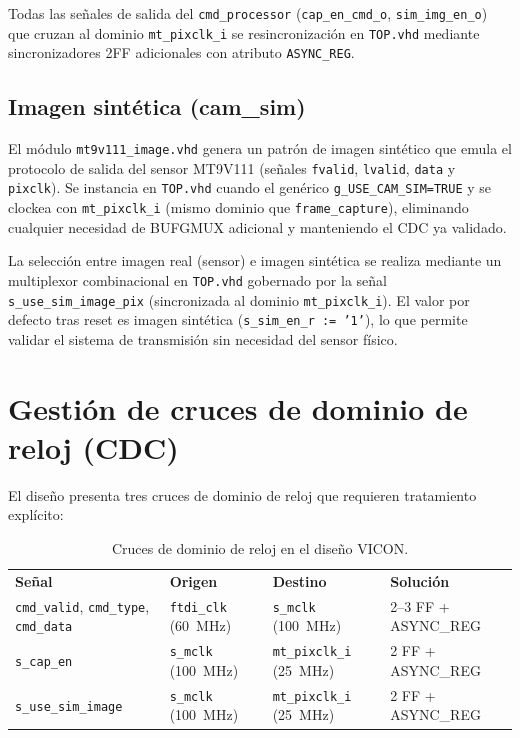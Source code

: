 \documentclass[../main.tex]{subfiles}
\begin{document}
Todas las señales de salida del \texttt{cmd\_processor} (\texttt{cap\_en\_cmd\_o}, \texttt{sim\_img\_en\_o}) que cruzan al dominio \texttt{mt\_pixclk\_i} se resincronización en \texttt{TOP.vhd} mediante sincronizadores 2FF adicionales con atributo \texttt{ASYNC\_REG}.

\subsection{Imagen sintética (cam\_sim)}
\label{sec:cam_sim}

El módulo \texttt{mt9v111\_image.vhd} genera un patrón de imagen sintético que emula el protocolo de salida del sensor MT9V111 (señales \texttt{fvalid}, \texttt{lvalid}, \texttt{data} y \texttt{pixclk}). Se instancia en \texttt{TOP.vhd} cuando el genérico \texttt{g\_USE\_CAM\_SIM=TRUE} y se clockea con \texttt{mt\_pixclk\_i} (mismo dominio que \texttt{frame\_capture}), eliminando cualquier necesidad de BUFGMUX adicional y manteniendo el CDC ya validado.

La selección entre imagen real (sensor) e imagen sintética se realiza mediante un multiplexor combinacional en \texttt{TOP.vhd} gobernado por la señal \texttt{s\_use\_sim\_image\_pix} (sincronizada al dominio \texttt{mt\_pixclk\_i}). El valor por defecto tras reset es imagen sintética (\texttt{s\_sim\_en\_r := '1'}), lo que permite validar el sistema de transmisión sin necesidad del sensor físico.

\section{Gestión de cruces de dominio de reloj (CDC)}
\label{sec:cdc}

El diseño presenta tres cruces de dominio de reloj que requieren tratamiento explícito:

\begin{table}[h]
\centering
\caption{Cruces de dominio de reloj en el diseño VICON.}
\label{tab:cdc}
\begin{tabular}{llll}
\rowcolor[HTML]{156082}
{\color{white}\textbf{Señal}} & {\color{white}\textbf{Origen}} & {\color{white}\textbf{Destino}} & {\color{white}\textbf{Solución}} \\
\rowcolor[HTML]{C0E6F5}
\texttt{cmd\_valid}, \texttt{cmd\_type}, \texttt{cmd\_data} & \texttt{ftdi\_clk} (60~MHz) & \texttt{s\_mclk} (100~MHz) & 2--3 FF + ASYNC\_REG \\
\texttt{s\_cap\_en} & \texttt{s\_mclk} (100~MHz) & \texttt{mt\_pixclk\_i} (25~MHz) & 2 FF + ASYNC\_REG \\
\rowcolor[HTML]{C0E6F5}
\texttt{s\_use\_sim\_image} & \texttt{s\_mclk} (100~MHz) & \texttt{mt\_pixclk\_i} (25~MHz) & 2 FF + ASYNC\_REG \\
\end{tabular}
\end{table}
\end{document}
